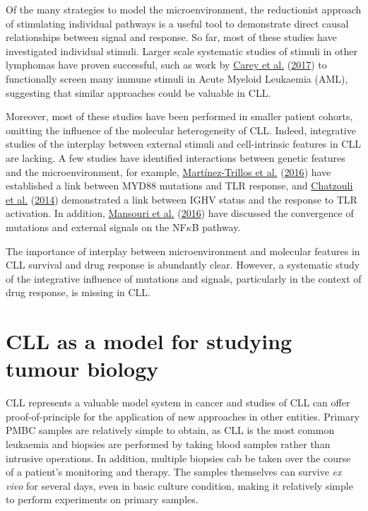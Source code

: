 \documentclass[11pt, a4paper, twosided]{book}
\begin{document}
Of the many strategies to model the microenvironment, the reductionist approach of stimulating individual pathways is a useful tool to demonstrate direct causal relationships between signal and response. So far, most of these studies have investigated individual stimuli. Larger scale systematic studies of stimuli in other lymphomas have proven successful, such as work by \protect\hyperlink{ref-Carey2017}{Carey et al.} (\protect\hyperlink{ref-Carey2017}{2017}) to functionally screen many immune stimuli in Acute Myeloid Leukaemia (AML), suggesting that similar approaches could be valuable in CLL.

Moreover, most of these studies have been performed in smaller patient cohorts, omitting the influence of the molecular heterogeneity of CLL. Indeed, integrative studies of the interplay between external stimuli and cell-intrinsic features in CLL are lacking. A few studies have identified interactions between genetic features and the microenvironment, for example, \protect\hyperlink{ref-Martinez2016}{Martínez-Trillos et al.} (\protect\hyperlink{ref-Martinez2016}{2016}) have established a link between MYD88 mutations and TLR response, and \protect\hyperlink{ref-Chatzouli2014}{Chatzouli et al.} (\protect\hyperlink{ref-Chatzouli2014}{2014}) demonstrated a link between IGHV status and the response to TLR activation. In addition, \protect\hyperlink{ref-Mansouri2016}{Mansouri et al.} (\protect\hyperlink{ref-Mansouri2016}{2016}) have discussed the convergence of mutations and external signals on the NF\(\kappa\)B pathway.

The importance of interplay between microenvironment and molecular features in CLL survival and drug response is abundantly clear. However, a systematic study of the integrative influence of mutations and signals, particularly in the context of drug response, is missing in CLL.

\hypertarget{CLL-model-intro}{%
\section{CLL as a model for studying tumour biology}\label{CLL-model-intro}}

CLL represents a valuable model system in cancer and studies of CLL can offer proof-of-principle for the application of new approaches in other entities. Primary PMBC samples are relatively simple to obtain, as CLL is the most common leukaemia and biopsies are performed by taking blood samples rather than intrusive operations. In addition, multiple biopsies cab be taken over the course of a patient's monitoring and therapy. The samples themselves can survive \emph{ex vivo} for several days, even in basic culture condition, making it relatively simple to perform experiments on primary samples.
\end{document}
